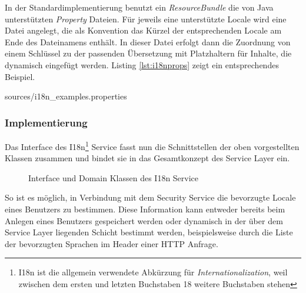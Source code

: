 In der Standardimplementierung benutzt ein \emph{ResourceBundle} die von Java
unterstützten \emph{Property} Dateien. Für jeweils eine unterstützte Locale wird
eine Datei angelegt, die als Konvention das Kürzel der entsprechenden Locale am
Ende des Dateinamens enthält. In dieser Datei erfolgt dann die Zuordnung von
einem Schlüssel zu der passenden Übersetzung mit Platzhaltern für Inhalte, die
dynamisch eingefügt werden. Listing \ref{lst:i18nprops} zeigt ein entsprechendes Beispiel.

\lstset{language=Python}
 {sources/i18n_examples.properties}

\subsubsection{Implementierung}
Das Interface des I18n\footnote{I18n ist die allgemein verwendete Abkürzung für
\emph{Internationalization}, weil zwischen dem ersten und letzten Buchstaben 18
weitere Buchstaben stehen} Service fasst nun die Schnittstellen der oben
vorgestellten Klassen zusammen und bindet sie in das Gesamtkonzept des Service
Layer ein.

\begin{figure}[bth]
	\caption{Interface und Domain Klassen des I18n Service}
	\label{ill:i18nservice}
\end{figure}

So ist es möglich, in Verbindung mit dem Security Service die bevorzugte
Locale eines Benutzers zu bestimmen. Diese Information kann entweder bereits
beim Anlegen eines Benutzers gespeichert werden oder dynamisch in der über dem
Service Layer liegenden Schicht bestimmt werden, beispielsweise durch die Liste
der bevorzugten Sprachen im Header einer \ac{HTTP} Anfrage.

